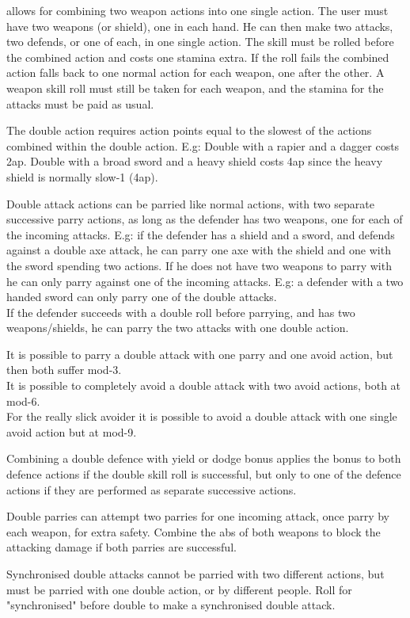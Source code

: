  allows for combining two weapon actions into one single action. The user must have two weapons (or shield), one in each hand. He can then make two attacks, two defends, or one of each, in one single action. The skill must be rolled before the combined action and costs one stamina extra. If the roll fails the combined action falls back to one normal action for each weapon, one after the other. A weapon skill roll must still be taken for each weapon, and the stamina for the attacks must be paid as usual.

The double action requires action points equal to the slowest of the actions combined within the double action. E.g: Double with a rapier and a dagger costs 2ap. Double with a broad sword and a heavy shield costs 4ap since the heavy shield is normally slow-1 (4ap).

Double attack actions can be parried like normal actions, with two separate successive parry actions, as long as the defender has two weapons, one for each of the incoming attacks. E.g: if the defender has a shield and a sword, and defends against a double axe attack, he can parry one axe with the shield and one with the sword spending two actions. If he does not have two weapons to parry with he can only parry against one of the incoming attacks. E.g: a defender with a two handed sword can only parry one of the double attacks.\\
If the defender succeeds with a double roll before parrying, and has two weapons/shields, he can parry the two attacks with one double action.

It is possible to parry a double attack with one parry and one avoid action, but then both suffer mod-3.\\
It is possible to completely avoid a double attack with two avoid actions, both at mod-6.\\
For the really slick avoider it is possible to avoid a double attack with one single avoid action but at mod-9.

Combining a double defence with yield or dodge bonus applies the bonus to both defence actions if the double skill roll is successful, but only to one of the defence actions if they are performed as separate successive actions.

Double parries can attempt two parries for one incoming attack, once parry by each weapon, for extra safety. Combine the abs of both weapons to block the attacking damage if both parries are successful.

Synchronised double attacks cannot be parried with two different actions, but must be parried with one double action, or by different people. Roll for "synchronised" before double to make a synchronised double attack.

